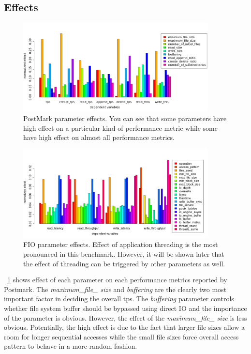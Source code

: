 \subsection{Effects}
\begin{figure}[!t]
\centering
\includegraphics[width=0.9\textwidth]{figure/pm_effect.png}
\captionsetup{format=myformat}
\caption{PostMark parameter effects. 
You can see that some parameters have high effect on a particular kind of performance metric while some have high effect on almost all performance metrics.}
\label{pm_effect}
\end{figure}

\begin{figure}[!t]
\centering
\includegraphics[width=0.9\textwidth]{figure/fio_effect.png}
\captionsetup{format=myformat}
\caption{FIO parameter effects. 
Effect of application threading is the most pronounced in this benchmark. 
However, it will be shown later that the effect of threading can be triggered by other parameters as well.}
\label{fio_effect}
\end{figure}

\figurename~\ref{pm_effect} shows effect of each parameter on each performance metrics reported by Postmark. 
The \emph{maximum\_file\_ size} and \emph{buffering} are the clearly two most important factor in deciding the overall tps. 
The \emph{buffering} parameter controls whether file system buffer should be bypassed using direct IO and the importance of the parameter is obvious. 
However, the effect of the \emph{maximum\_file\_ size} is less obvious. 
Potentially, the high effect is due to the fact that larger file sizes allow a room for longer sequential accesses while the small file sizes force overall access pattern to behave in a more random fashion. 

